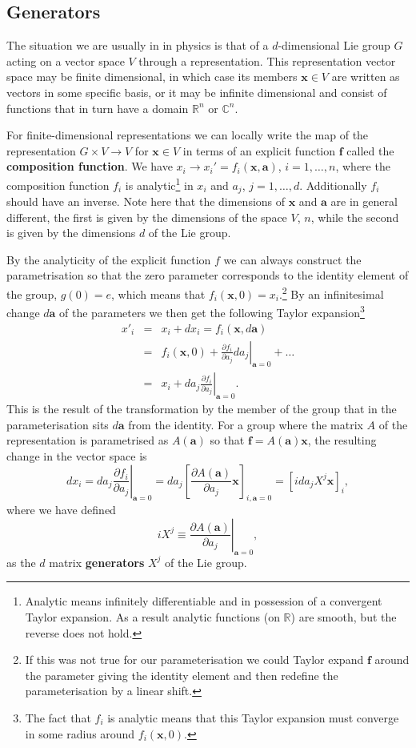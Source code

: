 \documentclass[notes.tex]{subfiles}
\begin{document}
\subsection{Generators}
\label{sec:generators}

The situation we are usually in in physics is that of a $d$-dimensional Lie group $G$ acting on a vector space $V$ through a representation. This representation vector space  may be finite dimensional, in which case its members $\mathbf x\in V$ are written as vectors in some specific basis, or it may be infinite dimensional and consist of functions that in turn have a domain $\mathbb R^n$ or $\mathbb C^n$.

For finite-dimensional representations we can locally write the map of the representation $G\times V \to V$ for $\mathbf{x} \in V$ in terms of an explicit function $\mathbf f$ called the {\bf composition function}. We have $x_i \to x_i' = f_i(\mathbf x, \mathbf a)$, $i=1, \ldots,n$, where the composition function $f_i$ is analytic\footnote{Analytic means infinitely differentiable and in possession of a  convergent Taylor expansion. As a result analytic functions (on $\mathbb{R}$) are smooth, but the reverse does not hold.} in $x_i$ and $a_j$, $j=1,\ldots,d$. Additionally $f_i$ should have an inverse. Note here that the dimensions of $\mathbf x$ and $\mathbf a$ are in general different, the first is given by the dimensions of the space $V$, $n$, while the second is given by the dimensions $d$ of the Lie group.

By the analyticity of the explicit function $f$ we can always construct the parametrisation so that the zero parameter corresponds to the identity element of the group, $g(0) = e$, which means that  $f_i(\mathbf x, 0)=x_i$.\footnote{If this was not true for our parameterisation we could Taylor expand $\mathbf f$ around the parameter giving the identity element and then redefine the parameterisation by a linear shift.} By an infinitesimal change $d\mathbf a$ of the  parameters we then get the following Taylor expansion\footnote{The fact that $f_i$ is analytic means that this Taylor expansion must converge in some radius around $f_i(\mathbf x,0)$.}
\begin{eqnarray*}
x'_i &=& x_i + dx_i = f_i(\mathbf x, d\mathbf a)\\
&=& f_i(\mathbf x, 0) + \left.\frac{\partial f_i}{\partial a_j}da_j\right|_{\mathbf a =0} +\ldots\\
&=& x_i +\left.da_j \frac{\partial f_i}{\partial a_j}\right|_{\mathbf a =0}.
\end{eqnarray*}
This is the result of the transformation by the member of the group that in the parameterisation sits $d\mathbf a$ from the identity. For a group where the matrix $A$ of the representation is parametrised as $A(\mathbf a)$ so that $\mathbf f = A(\mathbf a)\mathbf x$, the resulting change in the vector space is
\[
dx_i=\left.da_j\frac{\partial f_i}{\partial a_j}\right|_{\mathbf a =0}=da_j\left[\frac{\partial A(\mathbf a)}{\partial a_j}\mathbf{x}\right]_{i,\mathbf a=0}=[ida_jX^j\mathbf{x}]_i,
\]
where we have defined 
\[
iX^j\equiv \left. \frac{\partial A(\mathbf a)}{\partial a_j}\right|_{\mathbf a=0} ,
\]
as the $d$ matrix {\bf generators} $X^j$ of the Lie group.
\end{document}
